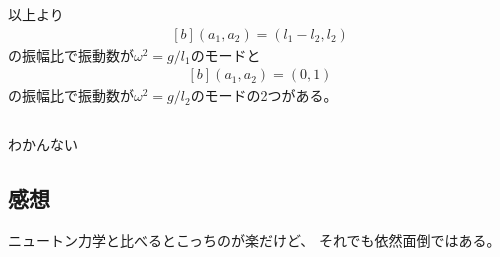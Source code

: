 \documentclass[../../sp_2016.tex]{subfiles}
\begin{document}
以上より
\begin{equation}\begin{aligned}[b]
    (a_1,a_2) = (l_1-l_2,l_2)
\end{aligned}\end{equation}
の振幅比で振動数が\(\omega^2=g/l_1\)のモードと
\begin{equation}\begin{aligned}[b]
    (a_1,a_2) = (0, 1)
\end{aligned}\end{equation}
の振幅比で振動数が\(\omega^2=g/l_2\)のモードの2つがある。

\subsection{}
わかんない


\subsection*{感想}
ニュートン力学と比べるとこっちのが楽だけど、
それでも依然面倒ではある。
\end{document}

